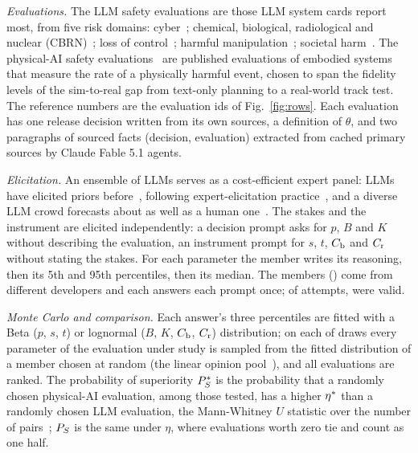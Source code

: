 \emph{Evaluations.} The \voiNLLM{} LLM safety evaluations are those LLM system cards report most, from five risk domains: cyber~\voiCiteCyber; chemical, biological, radiological and nuclear (CBRN)~\voiCiteCBRN; loss of control~\voiCiteLossOfControl; harmful manipulation~\voiCiteHarmfulManipulation; societal harm~\voiCiteSocietalHarm. The \voiNPhysical{} physical-AI safety evaluations~\voiCitePhysical{} are published evaluations of embodied systems that measure the rate of a physically harmful event, chosen to span the fidelity levels of the sim-to-real gap from text-only planning to a real-world track test. The reference numbers are the evaluation ids of Fig.~\ref{fig:rows}. Each evaluation has one release decision written from its own sources, a definition of $\theta$, and two paragraphs of sourced facts (decision, evaluation) extracted from cached primary sources by Claude Fable 5.1 agents.

\emph{Elicitation.} An ensemble of LLMs serves as a cost-efficient expert panel: LLMs have elicited priors before~\citep{capstick2024autoelicit,selby2025hadenough}, following expert-elicitation practice~\citep{ohagan2006uncertain}, and a diverse LLM crowd forecasts about as well as a human one~\citep{schoenegger2024wisdom}. The stakes and the instrument are elicited independently: a decision prompt asks for $p$, $B$ and $K$ without describing the evaluation, an instrument prompt for $s$, $t$, $C_\mathrm{b}$ and $C_\mathrm{r}$ without stating the stakes. For each parameter the member writes its reasoning, then its 5th and 95th percentiles, then its median. The \voiNMembers{} members (\voiMemberList) come from \voiNMembers{} different developers and each answers each prompt once; of \voiAttempts{} attempts, \voiValidShare{} were valid. %

\emph{Monte Carlo and comparison.} Each answer's three percentiles are fitted with a Beta ($p$, $s$, $t$) or lognormal ($B$, $K$, $C_\mathrm{b}$, $C_\mathrm{r}$) distribution; on each of \voiDraws{} draws every parameter of the evaluation under study is sampled from the fitted distribution of a member chosen at random (the linear opinion pool~\citep{stone1961opinionpool}), and all evaluations are ranked. The probability of superiority $P_{S}^{*}$ is the probability that a randomly chosen physical-AI evaluation, among those tested, has a higher $\eta^{*}$ than a randomly chosen LLM evaluation, the Mann-Whitney $U$ statistic over the number of pairs~\citep{mcgraw1992cles}; $P_{S}$ is the same under $\eta$, where evaluations worth zero tie and count as one half.
